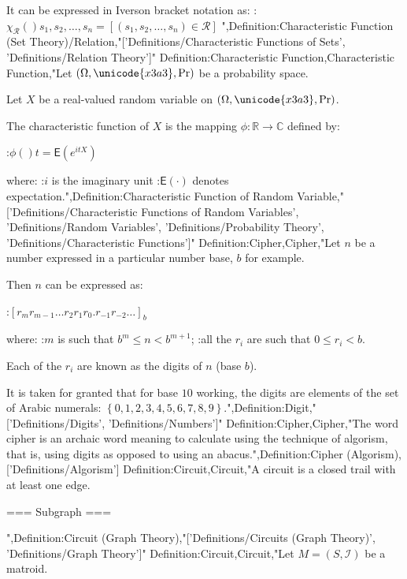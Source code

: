 It can be expressed in Iverson bracket notation as:
:$\chi_\mathcal R \left(   \right){s_1, s_2, \ldots, s_n} = \left[ \left( s_1, s_2, \ldots, s_n \right) \in \mathcal R \right]$
",Definition:Characteristic Function (Set Theory)/Relation,"['Definitions/Characteristic Functions of Sets', 'Definitions/Relation Theory']"
Definition:Characteristic Function,Characteristic Function,"Let $\left( \Omega, \unicode{x3a3}, \Pr \right)$ be a probability space.

Let $X$ be a real-valued random variable on $\left( \Omega, \unicode{x3a3}, \Pr \right)$.


The characteristic function of $X$ is the mapping $\phi: \mathbb R \to \mathbb C$ defined by:

:$\phi \left(   \right)t = \mathsf E \left( e^{i t X}  \right)$

where:
:$i$ is the imaginary unit
:$\mathsf E \left( \cdot \right)$ denotes expectation.",Definition:Characteristic Function of Random Variable,"['Definitions/Characteristic Functions of Random Variables', 'Definitions/Random Variables', 'Definitions/Probability Theory', 'Definitions/Characteristic Functions']"
Definition:Cipher,Cipher,"Let $n$ be a number expressed in a particular number base, $b$ for example.

Then $n$ can be expressed as:

:$\left[ r_m r_{m - 1} \ldots r_2 r_1 r_0 . r_{-1} r_{-2} \ldots \right]_b$

where:
:$m$ is such that $b^m \le n < b^{m + 1}$;
:all the $r_i$ are such that $0 \le r_i < b$.

Each of the $r_i$ are known as the digits of $n$ (base $b$).


It is taken for granted that for base $10$ working, the digits are elements of the set of Arabic numerals: $\left\lbrace 0, 1, 2, 3, 4, 5, 6, 7, 8, 9 \right\rbrace$.",Definition:Digit,"['Definitions/Digits', 'Definitions/Numbers']"
Definition:Cipher,Cipher,"The word cipher is an archaic word meaning to calculate using the technique of algorism, that is, using digits as opposed to using an abacus.",Definition:Cipher (Algorism),['Definitions/Algorism']
Definition:Circuit,Circuit,"A circuit is a closed trail with at least one edge.


=== Subgraph ===

",Definition:Circuit (Graph Theory),"['Definitions/Circuits (Graph Theory)', 'Definitions/Graph Theory']"
Definition:Circuit,Circuit,"Let $M = \left( S, \mathscr I \right)$ be a matroid.


